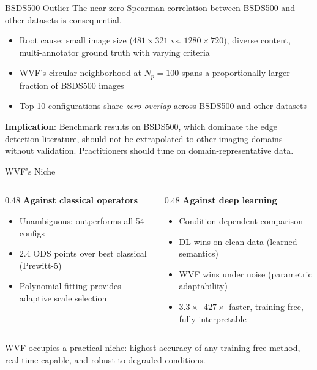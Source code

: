 \documentclass[10pt, aspectratio=169]{beamer}
\begin{document}
\begin{frame}{BSDS500 Outlier}
  The near-zero Spearman correlation between BSDS500 and other datasets is consequential.

  \vspace{0.5em}
  \begin{itemize}
    \item Root cause: small image size ($481 \times 321$ vs. $1280 \times 720$), diverse content, multi-annotator ground truth with varying criteria
    \item WVF's circular neighborhood at $N_p = 100$ spans a proportionally larger fraction of BSDS500 images
    \item Top-10 configurations share \textit{zero overlap} across BSDS500 and other datasets
  \end{itemize}

  \vspace{0.5em}
  \textbf{Implication}: Benchmark results on BSDS500, which dominate the edge detection literature, should not be extrapolated to other imaging domains without validation. Practitioners should tune on domain-representative data.
\end{frame}

\begin{frame}{WVF's Niche}
  \begin{columns}[T]
    \begin{column}{0.48\textwidth}
      \textbf{Against classical operators}
      \begin{itemize}
        \item Unambiguous: outperforms all 54 configs
        \item 2.4 ODS points over best classical (Prewitt-5)
        \item Polynomial fitting provides adaptive scale selection
      \end{itemize}
    \end{column}
    \begin{column}{0.48\textwidth}
      \textbf{Against deep learning}
      \begin{itemize}
        \item Condition-dependent comparison
        \item DL wins on clean data (learned semantics)
        \item WVF wins under noise (parametric adaptability)
        \item $3.3\times$--$427\times$ faster, training-free, fully interpretable
      \end{itemize}
    \end{column}
  \end{columns}

  \vspace{0.5em}
  WVF occupies a practical niche: highest accuracy of any training-free method, real-time capable, and robust to degraded conditions.
\end{frame}
\end{document}
